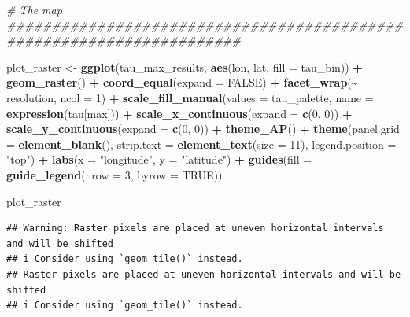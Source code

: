 \documentclass[
  11pt,
]{article}
\newenvironment{Shaded}{\begin{snugshade}}{\end{snugshade}}
\newcommand{\AttributeTok}[1]{\textcolor[rgb]{0.13,0.29,0.53}{#1}}
\newcommand{\CommentTok}[1]{\textcolor[rgb]{0.56,0.35,0.01}{\textit{#1}}}
\newcommand{\ConstantTok}[1]{\textcolor[rgb]{0.56,0.35,0.01}{#1}}
\newcommand{\DecValTok}[1]{\textcolor[rgb]{0.00,0.00,0.81}{#1}}
\newcommand{\FunctionTok}[1]{\textcolor[rgb]{0.13,0.29,0.53}{\textbf{#1}}}
\newcommand{\NormalTok}[1]{#1}
\newcommand{\OtherTok}[1]{\textcolor[rgb]{0.56,0.35,0.01}{#1}}
\newcommand{\SpecialCharTok}[1]{\textcolor[rgb]{0.81,0.36,0.00}{\textbf{#1}}}
\newcommand{\StringTok}[1]{\textcolor[rgb]{0.31,0.60,0.02}{#1}}
\begin{document}
\begin{Shaded}
\begin{Highlighting}[]
\CommentTok{\# The map \#\#\#\#\#\#\#\#\#\#\#\#\#\#\#\#\#\#\#\#\#\#\#\#\#\#\#\#\#\#\#\#\#\#\#\#\#\#\#\#\#\#\#\#\#\#\#\#\#\#\#\#\#\#\#\#\#\#\#\#\#\#\#\#\#\#\#\#\#\#}

\NormalTok{plot\_raster }\OtherTok{\textless{}{-}} \FunctionTok{ggplot}\NormalTok{(tau\_max\_results, }\FunctionTok{aes}\NormalTok{(lon, lat, }\AttributeTok{fill =}\NormalTok{ tau\_bin)) }\SpecialCharTok{+}
  \FunctionTok{geom\_raster}\NormalTok{() }\SpecialCharTok{+}
  \FunctionTok{coord\_equal}\NormalTok{(}\AttributeTok{expand =} \ConstantTok{FALSE}\NormalTok{) }\SpecialCharTok{+}
  \FunctionTok{facet\_wrap}\NormalTok{(}\SpecialCharTok{\textasciitilde{}}\NormalTok{ resolution, }\AttributeTok{ncol =} \DecValTok{1}\NormalTok{) }\SpecialCharTok{+}
  \FunctionTok{scale\_fill\_manual}\NormalTok{(}\AttributeTok{values =}\NormalTok{ tau\_palette, }\AttributeTok{name =} \FunctionTok{expression}\NormalTok{(tau[max])) }\SpecialCharTok{+}
  \FunctionTok{scale\_x\_continuous}\NormalTok{(}\AttributeTok{expand =} \FunctionTok{c}\NormalTok{(}\DecValTok{0}\NormalTok{, }\DecValTok{0}\NormalTok{)) }\SpecialCharTok{+}
  \FunctionTok{scale\_y\_continuous}\NormalTok{(}\AttributeTok{expand =} \FunctionTok{c}\NormalTok{(}\DecValTok{0}\NormalTok{, }\DecValTok{0}\NormalTok{)) }\SpecialCharTok{+}
  \FunctionTok{theme\_AP}\NormalTok{() }\SpecialCharTok{+}
  \FunctionTok{theme}\NormalTok{(}\AttributeTok{panel.grid =} \FunctionTok{element\_blank}\NormalTok{(),}
        \AttributeTok{strip.text =} \FunctionTok{element\_text}\NormalTok{(}\AttributeTok{size =} \DecValTok{11}\NormalTok{),}
        \AttributeTok{legend.position =} \StringTok{"top"}\NormalTok{) }\SpecialCharTok{+}
  \FunctionTok{labs}\NormalTok{(}\AttributeTok{x =} \StringTok{"longitude"}\NormalTok{, }\AttributeTok{y =} \StringTok{"latitude"}\NormalTok{) }\SpecialCharTok{+}
  \FunctionTok{guides}\NormalTok{(}\AttributeTok{fill =} \FunctionTok{guide\_legend}\NormalTok{(}\AttributeTok{nrow =} \DecValTok{3}\NormalTok{, }\AttributeTok{byrow =} \ConstantTok{TRUE}\NormalTok{))}

\NormalTok{plot\_raster}
\end{Highlighting}
\end{Shaded}

\begin{verbatim}
## Warning: Raster pixels are placed at uneven horizontal intervals and will be shifted
## i Consider using `geom_tile()` instead.
## Raster pixels are placed at uneven horizontal intervals and will be shifted
## i Consider using `geom_tile()` instead.
\end{verbatim}
\end{document}
